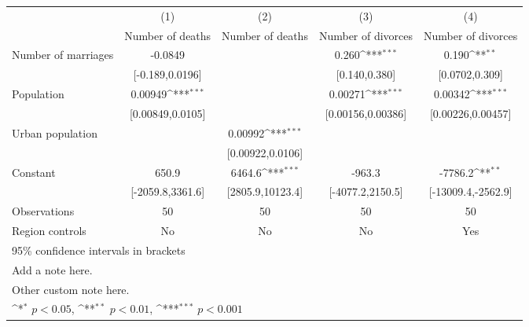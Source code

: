 {
\def\sym#1{\ifmmode^{#1}\else\(^{#1}\)\fi}
\begin{tabular}{l*{4}{c}}
\hline\hline
                    &\multicolumn{1}{c}{(1)}        &\multicolumn{1}{c}{(2)}        &\multicolumn{1}{c}{(3)}        &\multicolumn{1}{c}{(4)}        \\
                    &\multicolumn{1}{c}{Number of deaths}&\multicolumn{1}{c}{Number of deaths}&\multicolumn{1}{c}{Number of divorces}&\multicolumn{1}{c}{Number of divorces}\\
\hline
Number of marriages &               -0.0849         &                               &                 0.260\sym{***}&                 0.190\sym{**} \\
                    &       [-0.189,0.0196]         &                               &         [0.140,0.380]         &        [0.0702,0.309]         \\
[1em]
Population          &               0.00949\sym{***}&                               &               0.00271\sym{***}&               0.00342\sym{***}\\
                    &      [0.00849,0.0105]         &                               &     [0.00156,0.00386]         &     [0.00226,0.00457]         \\
[1em]
Urban population    &                               &               0.00992\sym{***}&                               &                               \\
                    &                               &      [0.00922,0.0106]         &                               &                               \\
[1em]
Constant            &                 650.9         &                6464.6\sym{***}&                -963.3         &               -7786.2\sym{**} \\
                    &      [-2059.8,3361.6]         &      [2805.9,10123.4]         &      [-4077.2,2150.5]         &    [-13009.4,-2562.9]         \\
\hline
Observations        &                    50         &                    50         &                    50         &                    50         \\
Region controls     &                    No         &                    No         &                    No         &                   Yes         \\
\hline\hline
\multicolumn{5}{l}{\footnotesize 95\% confidence intervals in brackets}\\
\multicolumn{5}{l}{\footnotesize Add a note here.}\\
\multicolumn{5}{l}{\footnotesize Other custom note here.}\\
\multicolumn{5}{l}{\footnotesize \sym{*} \(p<0.05\), \sym{**} \(p<0.01\), \sym{***} \(p<0.001\)}\\
\end{tabular}
}
